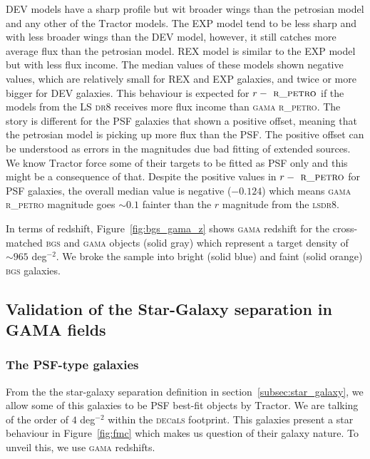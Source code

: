 \documentclass[fleqn,usenatbib]{mnras}
\newcommand{\BGS}{\textsc{bgs}\xspace}
\newcommand{\DECaLS}{\textsc{dec}a\textsc{ls}\xspace}
\newcommand{\DReight}{\textsc{dr8}\xspace}
\newcommand{\GAMA}{\textsc{gama}\xspace}
\newcommand{\LS}{\textsc{ls}\xspace}
\newcommand{\RPETRO}{{\textsc{ r\_petro}}\xspace}
\newcommand{\TRACTOR}{\textsc{T}ractor\xspace}
\begin{document}
DEV models have a sharp profile but wit broader wings than the petrosian model and any other of the \TRACTOR models. The EXP model tend to be less sharp and with less broader wings than the DEV model, however, it still catches more average flux than the petrosian model. REX model is similar to the EXP model but with less flux income. The median values of these models shown negative values, which are relatively small for REX and EXP galaxies, and twice or more bigger for DEV galaxies. This behaviour is expected for $r-\RPETRO$ if the models from the LS \DReight receives more flux income than \GAMA \RPETRO. The story is different for the PSF galaxies that shown a positive offset, meaning that the petrosian model is picking up more flux than the PSF. The positive offset can be understood as errors in the magnitudes due bad fitting of extended sources. We know \TRACTOR force some of their targets to be fitted as PSF only and this might be a consequence of that. Despite the positive values in $r-\RPETRO$ for PSF galaxies, the overall median value is negative ($-0.124$) which means \GAMA \RPETRO magnitude goes $\sim 0.1$ fainter than the $r$ magnitude from the \LS \DReight. 

In terms of redshift, Figure~\ref{fig:bgs_gama_z} shows \GAMA redshift for the cross-matched \BGS and \GAMA objects (solid gray) which represent a target density of $\sim 965$ deg$^{-2}$. We broke the sample into bright (solid blue) and faint (solid orange) \BGS galaxies.


\subsection{Validation of the Star-Galaxy separation in GAMA fields}
\subsubsection{The PSF-type galaxies}

From the the star-galaxy separation definition in section~\ref{subsec:star_galaxy}, we allow some of this galaxies to be PSF best-fit objects by \TRACTOR. We are talking of the order of $4$ deg$^{-2}$ within the \DECaLS footprint. This galaxies present a star behaviour in Figure~\ref{fig:fmc} which makes us question of their galaxy nature. To unveil this, we use \GAMA redshifts. 
\end{document}
